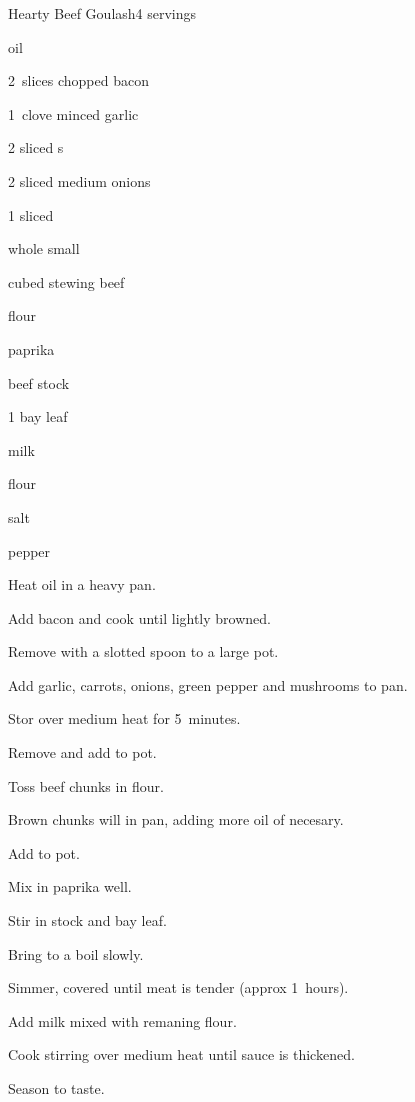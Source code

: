 \begin{recipe}{Hearty Beef Goulash}{}{4 servings}

\begin{ingredients}
\item {} oil
\item 2~slices chopped bacon
\item 1~clove minced garlic
\item 2 sliced s
\item 2 sliced medium onions
\item 1 sliced 
\item \lbs{\quarter} whole small 
\item \lbs{1\half} cubed stewing beef
\item \C{\quarter} flour
\item {}paprika
\item {} beef stock
\item 1 bay leaf
\item {} milk
\item {} flour
\item salt
\item pepper
\end{ingredients}

\begin{directions}
\item Heat oil in a heavy pan.
\item Add bacon and cook until lightly browned.
\item Remove with a slotted spoon to a large pot.
\item Add garlic, carrots, onions, green pepper and mushrooms to pan.
\item Stor over medium heat for 5~minutes.
\item Remove and add to pot.
\item Toss beef chunks in flour.
\item Brown chunks will in pan, adding more oil of necesary.
\item Add to pot.
\item Mix in paprika well.
\item Stir in stock and bay leaf.
\item Bring to a boil slowly.
\item Simmer, covered until meat is tender (approx 1\half~hours).
\item Add milk mixed with remaning flour.
\item Cook stirring over medium heat until sauce is thickened.
\item Season to taste.
\end{directions}

\end{recipe}
